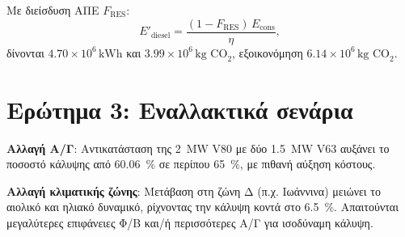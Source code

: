 \documentclass[10pt,a4paper]{article}
\begin{document}
Με διείσδυση ΑΠΕ $F_{\text{RES}}$:
\begin{equation}
E'_{\text{diesel}} = \frac{(1-F_{\text{RES}})\,E_{\text{cons}}}{\eta},
\end{equation}
δίνονται $4.70\times 10^{6}\,\text{kWh}$ και $3.99\times 10^{6}\,\text{kg CO}_2$, εξοικονόμηση $6.14\times 10^{6}\,\text{kg CO}_2$.

\section{Ερώτημα 3: Εναλλακτικά σενάρια}
\textbf{Αλλαγή Α/Γ}: Αντικατάσταση της \SI{2}{MW} V80 με δύο \SI{1.5}{MW} V63 αυξάνει το ποσοστό κάλυψης από \SI{60.06}{\percent} σε περίπου \SI{65}{\percent}, με πιθανή αύξηση κόστους.

\textbf{Αλλαγή κλιματικής ζώνης}: Μετάβαση στη ζώνη Δ (π.χ. Ιωάννινα) μειώνει το αιολικό και ηλιακό δυναμικό, ρίχνοντας την κάλυψη κοντά στο \SI{6.5}{\percent}. Απαιτούνται μεγαλύτερες επιφάνειες Φ/Β και/ή περισσότερες Α/Γ για ισοδύναμη κάλυψη.
\end{document}
